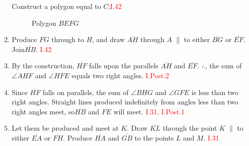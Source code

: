 \begin{con}
\begin{enumerate}
Construct a polygon equal to $C$;\hfill\textcolor{red}{I.42}

\begin{figure}[H]
	\caption{Polygon $BEFG$}
\end{figure} 
 
  \item Produce $\overline{FG}$ through to $H$,  and draw $\overline{AH}$ through $A$ $\parallel$ to either $\overline{BG}$ or $\overline{EF}$. Join$ \overline{HB}$. \hfill\textcolor{red}{ I.42}

\begin{figure}  [H]
	\caption{}
\end{figure} 
  
  \item By the construction, $\overline{HF}$ falls upon the parallels $\overline{AH}$ and $\overline{EF}$. $\therefore$, the sum of $\angle{AHF}$ and $\angle{HFE}$ equals two right angles. \hfill\textcolor{red}{ I.Post.2}
  
  \item Since $\overline{HF}$ falls on parallels, the sum of $\angle{BHG}$ and $\angle{GFE}$ is less than two right angles. Straight lines produced indefinitely from angles less than two right angles meet, so$ \overline{HB}$ and $\overline{FE}$ will meet. \hfill\textcolor{red}{ I.31, I.Post.1}
  
  \item Let them be produced and meet at $K$. Draw $\overline{KL}$ through the point $K$ $\parallel$ to either $\overline{EA}$ or $\overline{FH}$. Produce $\overline{HA}$ and $\overline{GB}$ to the points $L$ and $M$. \hfill\textcolor{red}{ I.31}
  

\end{enumerate}
\end{con}
